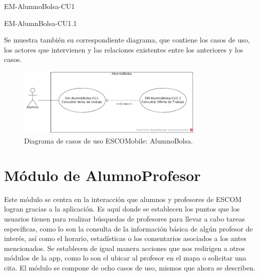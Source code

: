 \begin{requisitos}{EM-AlumnoBolsa-CU1}
\end{requisitos}

\begin{requisitos}{EM-AlumnBolsa-CU1.1}
\end{requisitos}

\noindent
Se muestra también su correspondiente diagrama, que contiene los casos de uso, los actores que intervienen
y las relaciones existentes entre los anteriores y los casos. 

\begin{figure}[htbp!]
	\centering
	\includegraphics[width=0.8\textwidth]{images/casos/alumnoBolsa}
	\caption{Diagrama de casos de uso ESCOMobile: AlumnoBolsa.}
\end{figure}

\newpage




\section{Módulo de AlumnoProfesor}

\noindent
Este módulo se centra en la interacción que alumnos y profesores de ESCOM logran gracias a la aplicación.
Es aquí donde se establecen los puntos que los usuarios tienen para realizar búsquedas de profesores para
llevar a cabo tareas específicas, como lo son la consulta de la información básica de algún profesor de
interés, así como el horario, estadísticas o los comentarios asociados a los antes mencionados. Se establecen
de igual manera acciones que nos redirigen a otros módulos de la app, como lo son el ubicar al profesor en el
mapa o solicitar una cita. 
El módulo se compone de ocho casos de uso, mismos que ahora se describen.

